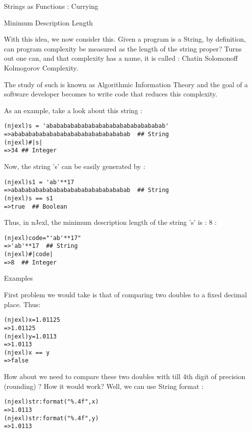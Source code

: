 \begin{section}{Strings as Functions : Currying}
\begin{subsection}{Minimum Description Length}

With this idea, we now consider this. Given a program is a String, by definition, can program complexity be measured as the length of the string proper? Turns out one can, and that complexity has a name, it is called : Chatin Solomonoff Kolmogorov Complexity.

The study of such is known as Algorithmic Information Theory and the goal of a software developer becomes to write code that reduces this complexity.

As an example, take a look about this string :

\begin{lstlisting}[style=all]
(njexl)s = 'ababababababababababababababababab'
=>ababababababababababababababababab  ## String
(njexl)#|s|
=>34 ## Integer
\end{lstlisting}

Now, the string 's' can be easily generated by :

\begin{lstlisting}[style=all]
(njexl)s1 = 'ab'**17
=>ababababababababababababababababab  ## String 
(njexl)s == s1
=>true  ## Boolean
\end{lstlisting}

Thus, in nJexl, the minimum description length of the string 's' is : 8 :

\begin{lstlisting}[style=all]
(njexl)code="'ab'**17"
=>'ab'**17  ## String 
(njexl)#|code|
=>8  ## Integer
\end{lstlisting}

\end{subsection}


\begin{subsection}{Examples}

First problem we would take is that of comparing two doubles to a fixed decimal place. Thus:

\begin{lstlisting}[style=all]
(njexl)x=1.01125
=>1.01125
(njexl)y=1.0113
=>1.0113
(njexl)x == y
=>false
\end{lstlisting}

How about we need to compare these two doubles with till 4th digit of precision (rounding) ? 
How it would work? Well, we can use String format :

\begin{lstlisting}[style=all]
(njexl)str:format("%.4f",x)
=>1.0113
(njexl)str:format("%.4f",y)
=>1.0113
\end{lstlisting}


\end{subsection}
\end{section}
